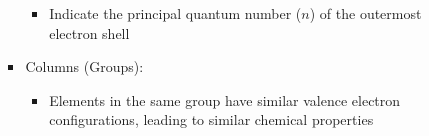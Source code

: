 \begin{itemize}
\begin{itemize}
\begin{itemize}
\begin{itemize}
              \item Indicate the principal quantum number ($n$) of the outermost electron shell

            \end{itemize}

          \item Columns (Groups):

            \begin{itemize}

              \item Elements in the same group have similar valence electron configurations, leading to similar chemical properties

            \end{itemize}

        \end{itemize}

    \end{itemize}

\end{itemize}



